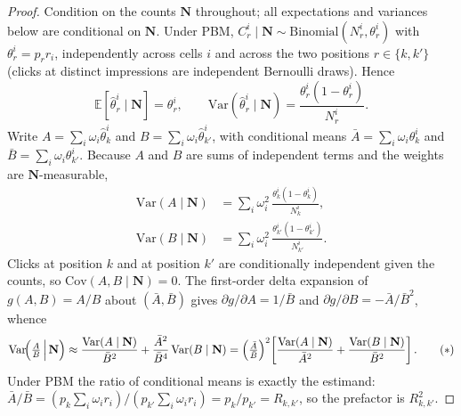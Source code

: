 \documentclass[11pt]{article}
\begin{document}
\begin{proof}
Condition on the counts $\mathbf N$ throughout; all expectations and
variances below are conditional on $\mathbf N$. Under PBM,
$C_r^i\mid\mathbf N\sim\mathrm{Binomial}(N_r^i,\theta_r^i)$ with
$\theta_r^i=p_r r_i$, independently across cells $i$ and across the two
positions $r\in\{k,k'\}$ (clicks at distinct impressions are independent
Bernoulli draws). Hence
\[
\mathbb E[\hat\theta_r^i\mid\mathbf N]=\theta_r^i,
\qquad
\mathrm{Var}(\hat\theta_r^i\mid\mathbf N)
=\frac{\theta_r^i(1-\theta_r^i)}{N_r^i}.
\]
Write $A=\sum_i\omega_i\hat\theta_k^i$ and
$B=\sum_i\omega_i\hat\theta_{k'}^i$, with conditional means
$\bar A=\sum_i\omega_i\theta_k^i$ and $\bar B=\sum_i\omega_i\theta_{k'}^i$.
Because $A$ and $B$ are sums of independent terms and the weights are
$\mathbf N$-measurable,
\begin{align}
\mathrm{Var}(A\mid\mathbf N)
&=\sum_i\omega_i^2\,\frac{\theta_k^i(1-\theta_k^i)}{N_k^i},
\label{eq:varA}\\
\mathrm{Var}(B\mid\mathbf N)
&=\sum_i\omega_i^2\,\frac{\theta_{k'}^i(1-\theta_{k'}^i)}{N_{k'}^i}.
\label{eq:varB}
\end{align}
Clicks at position $k$ and at position $k'$ are conditionally
independent given the counts, so $\mathrm{Cov}(A,B\mid\mathbf N)=0$.
The first-order delta expansion of $g(A,B)=A/B$ about $(\bar A,\bar B)$
gives $\partial g/\partial A=1/\bar B$ and
$\partial g/\partial B=-\bar A/\bar B^2$, whence
\[
\mathrm{Var}\!\Bigl(\tfrac{A}{B}\,\Big|\,\mathbf N\Bigr)
\approx
\frac{\mathrm{Var}(A\mid\mathbf N)}{\bar B^2}
+\frac{\bar A^2}{\bar B^4}\,\mathrm{Var}(B\mid\mathbf N)
=\Bigl(\tfrac{\bar A}{\bar B}\Bigr)^2
\!\left[\frac{\mathrm{Var}(A\mid\mathbf N)}{\bar A^2}
+\frac{\mathrm{Var}(B\mid\mathbf N)}{\bar B^2}\right].
\tag{$\ast$}
\]
Under PBM the ratio of conditional means is exactly the estimand:
$\bar A/\bar B=(p_k\sum_i\omega_i r_i)/(p_{k'}\sum_i\omega_i r_i)
=p_k/p_{k'}=R_{k,k'}$, so the prefactor is $R_{k,k'}^2$.


\end{proof}
\end{document}
